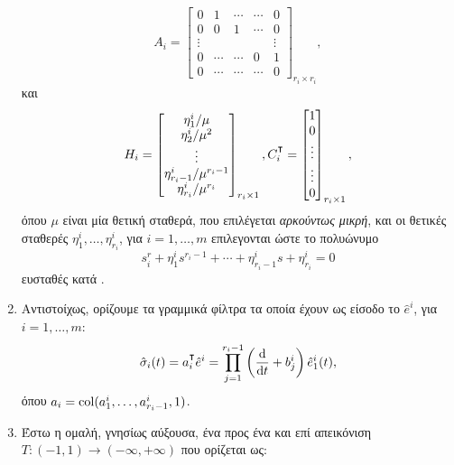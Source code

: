 \begin{enumerate}[label=\Roman*., ref=\Roman*]
        \[
            A_i = \begin{bmatrix}
                0 & 1 & \cdots & \cdots & 0 \\
                0 & 0 & 1 & \cdots & 0 \\
                \vdots & & & & \vdots \\
                0 & \cdots & \cdots & 0 & 1 \\
                0 & \cdots & \cdots & \cdots & 0
            \end{bmatrix}_{r_i \times r_i},
        \]
        και
        \[
            H_i = \begin{bmatrix}
                \eta_1^i/\mu \\ \eta_2^i/\mu^2 \\ \vdots \\ 
                \eta_{r_i-1}^i/\mu^{r_i-1} \\ \eta_{r_i}^i/\mu^{r_i}
            \end{bmatrix}_{r_i \times 1}, 
            C_i^\T = \begin{bmatrix}
                1 \\ 0 \\ \vdots \\ \vdots \\ 0
            \end{bmatrix}_{r_i \times 1},
        \]
        όπου $\mu$ είναι μία θετική σταθερά, που επιλέγεται \emph{αρκούντως μικρή}, και οι θετικές σταθερές  $\eta^i_1, \ldots, \eta^i_{r_i}$, για $i = 1,\ldots, m$ επιλεγονται ώστε το πολυώνυμο
        \begin{equation}
            \label{eq:hgo poly}
            s^r_i + \eta_1^i s^{r_i-1} + \cdots 
            + \eta_{r_i-1}^i s + \eta_{r_i}^i = 0
        \end{equation}
         ευσταθές κατά \hur.
    \item 
        Αντιστοίχως, ορίζουμε τα γραμμικά φίλτρα τα οποία έχουν ως είσοδο το $\hat e^i$, για $i = 1,\ldots, m$:
        \begin{equation}
            \label{eq:surface estimate}
            \hat \sigma_i(t) = a_i^\T \hat e^i = \prod_{j=1}^{r_i - 1}\left( 
            \frac{\mathrm d}{\mathrm dt} + b_j^i \right)\hat e^i_1(t),
        \end{equation}
        όπου $a_i = \operatorname{col}(a_1^i, \ldots, a_{r_i-1}^i, 1)$.
    \item \label{item: control}
        Έστω η ομαλή, γνησίως αύξουσα, ένα προς ένα και επί απεικόνιση $T: (-1, 1) \rightarrow (-\infty, +\infty)$ που ορίζεται ως:

\end{enumerate}
